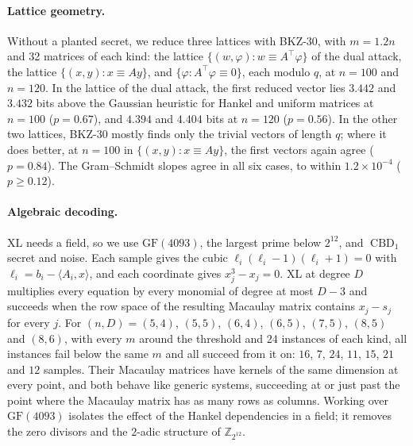 \documentclass[11pt,a4paper]{article}
\theoremstyle{definition}
\newcommand{\Z}{\mathbb{Z}}
\newcommand{\CBD}{\operatorname{CBD}}
\begin{document}
\paragraph{Lattice geometry.} Without a planted secret, we reduce three lattices with BKZ-30, with $m = 1.2n$ and 32 matrices of each kind: the lattice $\{(w, \varphi) : w \equiv A^{\top}\varphi\}$ of the dual attack, the lattice $\{(x, y) : x \equiv Ay\}$, and $\{\varphi : A^{\top}\varphi \equiv 0\}$, each modulo $q$, at $n = 100$ and $n = 120$. In the lattice of the dual attack, the first reduced vector lies $3.442$ and $3.432$ bits above the Gaussian heuristic for Hankel and uniform matrices at $n = 100$ ($p = 0.67$), and $4.394$ and $4.404$ bits at $n = 120$ ($p = 0.56$). In the other two lattices, BKZ-30 mostly finds only the trivial vectors of length $q$; where it does better, at $n = 100$ in $\{(x, y) : x \equiv Ay\}$, the first vectors again agree ($p = 0.84$). The Gram--Schmidt slopes agree in all six cases, to within $1.2 \times 10^{-4}$ ($p \ge 0.12$).

\paragraph{Algebraic decoding.} XL needs a field, so we use $\mathrm{GF}(4093)$, the largest prime below $2^{12}$, and $\CBD_1$ secret and noise. Each sample gives the cubic $\ell_i(\ell_i - 1)(\ell_i + 1) = 0$ with $\ell_i = b_i - \langle A_i, x \rangle$, and each coordinate gives $x_j^3 - x_j = 0$. XL at degree $D$ multiplies every equation by every monomial of degree at most $D - 3$ and succeeds when the row space of the resulting Macaulay matrix contains $x_j - s_j$ for every $j$. For $(n, D) = (5, 4)$, $(5, 5)$, $(6, 4)$, $(6, 5)$, $(7, 5)$, $(8, 5)$ and $(8, 6)$, with every $m$ around the threshold and 24 instances of each kind, all instances fail below the same $m$ and all succeed from it on: $16$, $7$, $24$, $11$, $15$, $21$ and $12$ samples. Their Macaulay matrices have kernels of the same dimension at every point, and both behave like generic systems, succeeding at or just past the point where the Macaulay matrix has as many rows as columns. Working over $\mathrm{GF}(4093)$ isolates the effect of the Hankel dependencies in a field; it removes the zero divisors and the $2$-adic structure of $\Z_{2^{12}}$.
\end{document}
